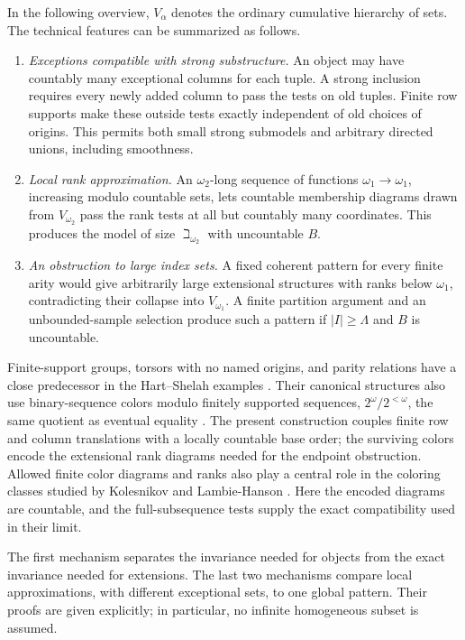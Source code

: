 In the following overview, \(V_\alpha\) denotes the ordinary cumulative
hierarchy of sets. The technical features can be summarized as follows.
\begin{enumerate}
 \item \emph{Exceptions compatible with strong substructure.}
       An object may have countably many exceptional columns for each
       tuple. A strong inclusion requires every newly added column to
       pass the tests on old tuples. Finite row supports make these
       outside tests exactly independent of old choices of origins.
       This permits both small strong submodels and arbitrary directed
       unions, including smoothness.
 \item \emph{Local rank approximation.}
       An \(\omega_2\)-long sequence of functions
       \(\omega_1\to\omega_1\), increasing modulo countable sets,
       lets countable membership diagrams drawn from
       \(V_{\omega_2}\) pass the rank tests at all but countably many
       coordinates. This produces the model of size
       \(\beth_{\omega_2}\) with uncountable \(B\).
 \item \emph{An obstruction to large index sets.}
       A fixed coherent pattern for every finite arity would give
       arbitrarily large extensional structures with ranks below
       \(\omega_1\), contradicting their collapse into
       \(V_{\omega_1}\). A finite partition argument and an
       unbounded-sample selection produce such a pattern if
       \(|I|\ge\Lambda\) and \(B\) is uncountable.
\end{enumerate}
Finite-support groups, torsors with no named origins, and parity
relations have a close predecessor in the Hart--Shelah examples
\cite[Section~1]{HartShelah1990}. Their canonical structures also use
binary-sequence colors modulo finitely supported sequences,
\(2^\omega/2^{<\omega}\), the same quotient as eventual equality \cite[Section~3]{HartShelah1990}. The present construction
couples finite row and column translations with a locally countable
base order; the surviving colors encode the extensional rank diagrams
needed for the endpoint obstruction. Allowed finite color diagrams and
ranks also play a central role in the coloring classes studied by
Kolesnikov and Lambie-Hanson \cite{KolesnikovLambieHanson2016}.
Here the encoded diagrams are countable, and the full-subsequence tests
supply the exact compatibility used in their limit.

The first mechanism separates the invariance needed for objects from
the exact invariance needed for extensions. The last two mechanisms
compare local approximations, with different exceptional sets, to one
global pattern. Their proofs are given explicitly; in particular, no
infinite homogeneous subset is assumed.

